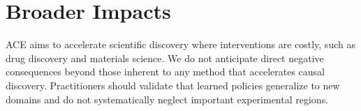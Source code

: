 \documentclass{article}
\theoremstyle{plain}
\theoremstyle{definition}
\theoremstyle{remark}
\begin{document}



\section*{Broader Impacts}

ACE aims to accelerate scientific discovery where interventions are costly, such as drug discovery and materials science. We do not anticipate direct negative consequences beyond those inherent to any method that accelerates causal discovery. Practitioners should validate that learned policies generalize to new domains and do not systematically neglect important experimental regions.

\appendix



\end{document}
